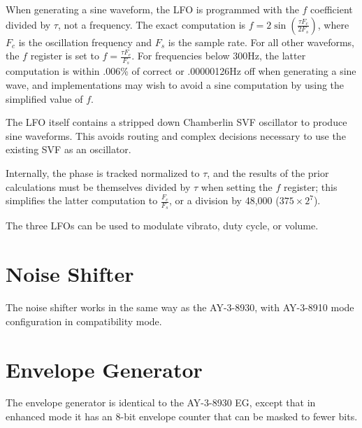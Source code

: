 When generating a sine waveform, the LFO is programmed with the $f$ coefficient divided by $\tau$, not a frequency.  The exact computation is $f=2\sin\left(\frac{\tau F_c}{2F_s}\right)$, where $F_c$ is the oscillation frequency and $F_s$ is the sample rate.  For all other waveforms, the $f$ register is set to $f=\frac{\tau F_c}{F_s}$.  For frequencies below 300Hz, the latter computation is within .006\% of correct or .00000126Hz off when generating a sine wave, and implementations may wish to avoid a sine computation by using the simplified value of $f$.

The LFO itself contains a stripped down Chamberlin SVF oscillator to produce sine waveforms.  This avoids routing and complex decisions necessary to use the existing SVF as an oscillator.

Internally, the phase is tracked normalized to $\tau$, and the results of the prior calculations must be themselves divided by $\tau$ when setting the $f$ register; this simplifies the latter computation to $\frac{F_c}{F_s}$, or a division by 48,000 ($375 \times 2^7$).

The three LFOs can be used to modulate vibrato, duty cycle, or volume.

\section{Noise Shifter}

The noise shifter works in the same way as the AY-3-8930, with AY-3-8910 mode configuration in compatibility mode.

\section{Envelope Generator}

The envelope generator is identical to the AY-3-8930 EG, except that in enhanced mode it has an 8-bit envelope counter that can be masked to fewer bits.